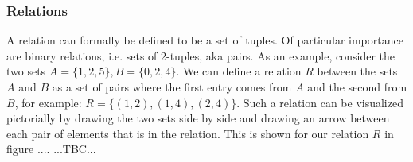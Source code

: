


\subsubsection{Relations}
A relation can formally be defined to be a set of tuples. Of particular importance are binary relations, i.e. sets of 2-tuples, aka pairs. As an example, consider the two sets $A = \{1,2,5\}, B = \{0,2,4\}$. We can define a relation $R$ between the sets $A$ and $B$ as a set of pairs where the first entry comes from $A$ and the second from $B$, for example: $R = \{(1,2),(1,4),(2,4)\}$. Such a relation can be visualized pictorially by drawing the two sets side by side and drawing an arrow between each pair of elements that is in the relation. This is shown for our relation $R$ in figure .... ...TBC...


